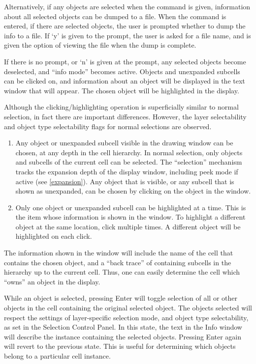 Alternatively, if any objects are selected when the command is given,
information about all selected objects can be dumped to a file.  When
the command is entered, if there are selected objects, the user is
prompted whether to dump the info to a file.  If `{\vt y}' is given to
the prompt, the user is asked for a file name, and is given the option
of viewing the file when the dump is complete.

If there is no prompt, or `{\vt n}' is given at the prompt, any
selected objects become deselected, and ``info mode'' becomes active. 
Objects and unexpanded subcells can be clicked on, and information
about an object will be displayed in the text window that will appear. 
The chosen object will be highlighted in the display.

Although the clicking/highlighting operation is superficially similar
to normal selection, in fact there are important differences. 
However, the layer selectability and object type selectability flags
for normal selections are observed.

\begin{enumerate}
\item{Any object or unexpanded subcell visible in the drawing window
can be chosen, at any depth in the cell hierarchy.  In normal
selection, only objects and subcells of the current cell can be
selected.  The ``selection'' mechanism tracks the expansion depth of
the display window, including peek mode if active (see
\ref{expansion}).  Any object that is visible, or any subcell that is
shown as unexpanded, can be chosen by clicking on the object in the
window.}

\item{Only one object or unexpanded subcell can be highlighted at a
time.  This is the item whose information is shown in the window.  To
highlight a different object at the same location, click multiple
times.  A different object will be highlighted on each click.}
\end{enumerate}

The information shown in the window will include the name of the cell
that contains the chosen object, and a ``back trace'' of containing
subcells in the hierarchy up to the current cell.  Thus, one can
easily determine the cell which ``owns'' an object in the display.

While an object is selected, pressing {\kb Enter} will toggle
selection of all or other objects in the cell containing the original
selected object.  The objects selected will respect the settings of
layer-specific selection mode, and object type selectability, as set
in the {\cb Selection Control Panel}.  In this state, the text in the
{\cb Info} window will describe the instance containing the selected
objects.  Pressing {\kb Enter} again will revert to the previous
state.  This is useful for determining which objects belong to a
particular cell instance.

